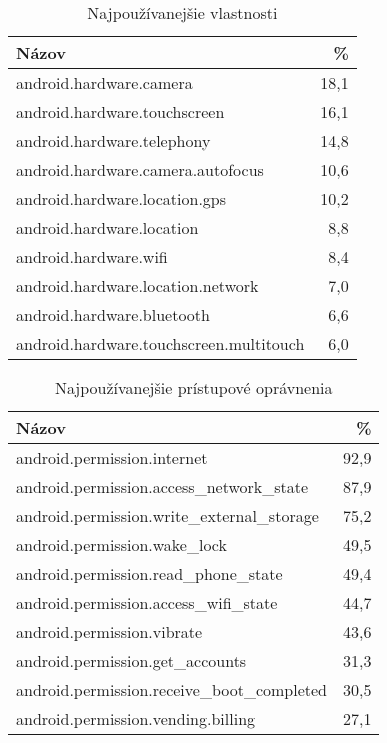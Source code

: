 \documentclass[
  digital, %
  table,   %
  lof,     %
  lot,     %
]{fithesis3}
\begin{document}
\begin{table}[htb]
\centering
  \begin{tabular}{|l r|}
    \hline
    Názov & \% \\\hline\hline
    android.hardware.camera & 18,1 \\
    android.hardware.touchscreen & 16,1 \\
    android.hardware.telephony & 14,8 \\
    android.hardware.camera.autofocus & 10,6 \\
    android.hardware.location.gps & 10,2 \\
    android.hardware.location & 8,8 \\
    android.hardware.wifi & 8,4 \\
    android.hardware.location.network & 7,0\\
    android.hardware.bluetooth & 6,6\\
    android.hardware.touchscreen.multitouch & 6,0\\
    \hline
  \end{tabular}
  \caption{Najpoužívanejšie vlastnosti}
  \label{tab:features}
\end{table}

\begin{table}[!htbp]
\centering
  \begin{tabular}{|l r|}
    \hline
    Názov & \% \\\hline\hline
    android.permission.internet & 92,9 \\
    android.permission.access\_network\_state & 87,9 \\
    android.permission.write\_external\_storage & 75,2 \\
    android.permission.wake\_lock & 49,5 \\
    android.permission.read\_phone\_state & 49,4 \\
    android.permission.access\_wifi\_state & 44,7 \\
    android.permission.vibrate & 43,6 \\
    android.permission.get\_accounts & 31,3 \\
    android.permission.receive\_boot\_completed & 30,5 \\
    android.permission.vending.billing & 27,1 \\
    \hline
  \end{tabular}
  \caption{Najpoužívanejšie prístupové oprávnenia}
  \label{tab:permissions}
\end{table}
\end{document}
